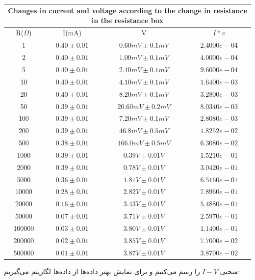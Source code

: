 \documentclass{article}
\begin{document}
\begin{latin}
\begin{center}
\begin{table}[h!]
\begin{tabular}{|c|c|c|c|}
\hline
\multicolumn{4}{|c|}{Changes in current and voltage according to the change in resistance in the resistance box} \\
\hline
R($\Omega$) & I(mA) & V & $I*v$\\
\hline
1&$0.40\pm0.01$ &$0.60mV\pm0.1mV$& $2.4000e-04$ \\ 
\hline
2&$0.40\pm0.01$ &$1.00mV\pm0.1mV$& $ 4.0000e-04$ \\
\hline
5&$0.40\pm0.01$ &$2.40mV\pm0.1mV$& $9.6000e-04$ \\
\hline
10&$0.40\pm0.01$ &$4.10mV\pm0.1mV$& $1.6400e-03$ \\
\hline
20&$0.40\pm0.01$ &$8.20mV\pm0.1mV$& $3.2800e-03$ \\
\hline
50&$0.39\pm0.01$ &$20.60mV\pm0.2mV$& $8.0340e-03$ \\
\hline
100&$0.39\pm0.01$ &$7.20mV\pm0.1mV$& $2.8080e-03$ \\
\hline
200&$0.39\pm0.01$ &$46.8mV\pm0.5mV$& $1.8252e-02$ \\
\hline
500&$0.38\pm0.01$ &$166.0mV\pm0.5mV$& $6.3080e-02$ \\
\hline
1000&$0.39\pm0.01$ &$0.39V\pm0.01V$& $1.5210e-01$ \\
\hline
2000&$0.39\pm0.01$ &$0.78V\pm0.01V$& $3.0420e-01$ \\
\hline
5000&$0.36\pm0.01$ &$1.81V\pm0.01V$& $6.5160e-01$ \\
\hline
10000&$0.28\pm0.01$ &$2.82V\pm0.01V$& $7.8960e-01$ \\
\hline
20000&$0.16\pm0.01$ &$3.43V\pm0.01V$& $5.4880e-01$ \\
\hline
50000&$0.07\pm0.01$ &$3.71V\pm0.01V$& $2.5970e-01$ \\
\hline
100000&$0.03\pm0.01$ &$3.80V\pm0.01V$& $1.1400e-01$ \\
\hline
200000&$0.02\pm0.01$ &$3.85V\pm0.01V$& $7.7000e-02$ \\
\hline
500000&$0.01\pm0.01$ &$3.87V\pm0.01V$& $3.8700e-02$ \\
\hline
\end{tabular}
\caption{}
\end{table}
\end{center}
\end{latin}
	\newpage
	منحنی $I-V$ را رسم ‌می‌کنیم و برای نمایش بهتر داده‌ها از داده‌ها لگاریتم می‌‌گیریم: 
\end{document}
